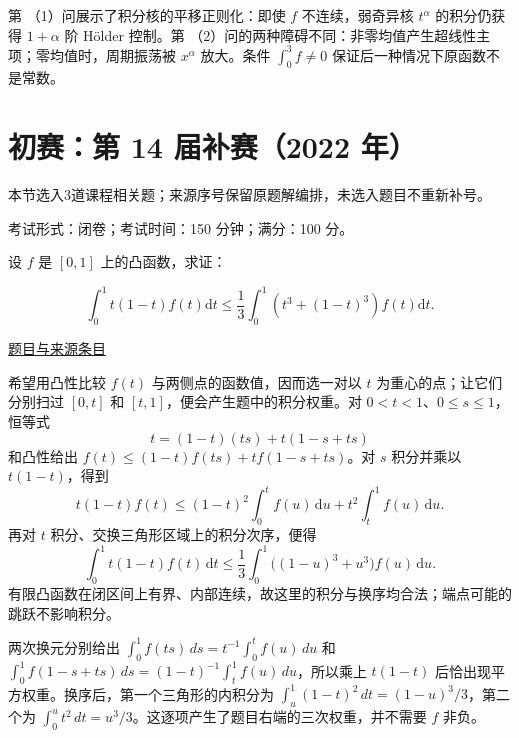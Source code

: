 \documentclass[UTF8,12pt,a4paper,fontset=fandol]{ctexart}
\begin{document}
\begin{remark}[方法与条件]第 （1）问展示了积分核的平移正则化：即使 $f$ 不连续，弱奇异核 $t^\alpha$ 的积分仍获得 $1+\alpha$ 阶 Hölder 控制。第 （2）问的两种障碍不同：非零均值产生超线性主项；零均值时，周期振荡被 $x^\alpha$ 放大。条件 $\int_0^3f\neq0$ 保证后一种情况下原函数不是常数。\end{remark}

\section{初赛：第 14 届补赛（2022 年）}

本节选入3道课程相关题；来源序号保留原题解编排，未选入题目不重新补号。

\begin{remark}[来源说明]考试形式：闭卷；考试时间：150 分钟；满分：100 分。\end{remark}

\begin{example}[来源序号2]\label{ex:ch05-14th-A-makeup:2}\label{pr:ch05-14th-A-makeup:2}

设 $f$ 是 $[0,1]$ 上的凸函数，求证：

\[
\int_0^1 t(1-t)f(t) \mathrm{d}t \leq \frac{1}{3} \int_0^1 \left(t^3+(1-t)^3\right)f(t) \mathrm{d}t.
\]

\par\href{https://github.com/lzxcr/cmc-mathematics/blob/64916fa1fdbc3e444a652eca204d5669058ee321/src/problems/preliminary/14-makeup/02.md}{题目与来源条目}

\end{example}

\begin{solve}\label{ans:ch05-14th-A-makeup:2}

希望用凸性比较 $f(t)$ 与两侧点的函数值，因而选一对以 $t$ 为重心的点；让它们分别扫过 $[0,t]$ 和 $[t,1]$，便会产生题中的积分权重。对 $0<t<1$、$0\leq s\leq1$，恒等式
\[
t=(1-t)(ts)+t(1-s+ts)
\]
和凸性给出 $f(t)\leq(1-t)f(ts)+tf(1-s+ts)$。对 $s$ 积分并乘以 $t(1-t)$，得到
\[
t(1-t)f(t)\leq(1-t)^2\int_0^t f(u)\,\mathrm du
+t^2\int_t^1f(u)\,\mathrm du.
\]
再对 $t$ 积分、交换三角形区域上的积分次序，便得
\[
\int_0^1t(1-t)f(t)\,\mathrm dt
\leq\frac13\int_0^1\bigl((1-u)^3+u^3\bigr)f(u)\,\mathrm du.
\]
有限凸函数在闭区间上有界、内部连续，故这里的积分与换序均合法；端点可能的跳跃不影响积分。

两次换元分别给出 $\int_0^1f(ts)\,ds=t^{-1}\int_0^tf(u)\,du$ 和 $\int_0^1f(1-s+ts)\,ds=(1-t)^{-1}\int_t^1f(u)\,du$，所以乘上 $t(1-t)$ 后恰出现平方权重。换序后，第一个三角形的内积分为 $\int_u^1(1-t)^2\,dt=(1-u)^3/3$，第二个为 $\int_0^ut^2\,dt=u^3/3$。这逐项产生了题目右端的三次权重，并不需要 $f$ 非负。

\end{solve}
\end{document}
